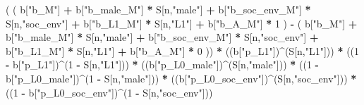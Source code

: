 \documentclass[
]{book}
\newenvironment{Shaded}{\begin{snugshade}}{\end{snugshade}}
\newcommand{\DecValTok}[1]{\textcolor[rgb]{0.00,0.00,0.81}{#1}}
\newcommand{\NormalTok}[1]{#1}
\newcommand{\SpecialCharTok}[1]{\textcolor[rgb]{0.81,0.36,0.00}{\textbf{#1}}}
\newcommand{\StringTok}[1]{\textcolor[rgb]{0.31,0.60,0.02}{#1}}
\begin{document}
\begin{Shaded}
\begin{Highlighting}[]
\NormalTok{      ( ( b[}\StringTok{"b\_M"}\NormalTok{] }\SpecialCharTok{+} 
\NormalTok{            b[}\StringTok{"b\_male\_M"}\NormalTok{] }\SpecialCharTok{*}\NormalTok{ S[n,}\StringTok{"male"}\NormalTok{] }\SpecialCharTok{+} 
\NormalTok{            b[}\StringTok{"b\_soc\_env\_M"}\NormalTok{] }\SpecialCharTok{*}\NormalTok{ S[n,}\StringTok{"soc\_env"}\NormalTok{] }\SpecialCharTok{+} 
\NormalTok{            b[}\StringTok{"b\_L1\_M"}\NormalTok{] }\SpecialCharTok{*}\NormalTok{ S[n,}\StringTok{"L1"}\NormalTok{] }\SpecialCharTok{+}
\NormalTok{            b[}\StringTok{"b\_A\_M"}\NormalTok{] }\SpecialCharTok{*} \DecValTok{1}\NormalTok{ ) }\SpecialCharTok{{-}} 
\NormalTok{          ( b[}\StringTok{"b\_M"}\NormalTok{] }\SpecialCharTok{+} 
\NormalTok{              b[}\StringTok{"b\_male\_M"}\NormalTok{] }\SpecialCharTok{*}\NormalTok{ S[n,}\StringTok{"male"}\NormalTok{] }\SpecialCharTok{+} 
\NormalTok{              b[}\StringTok{"b\_soc\_env\_M"}\NormalTok{] }\SpecialCharTok{*}\NormalTok{ S[n,}\StringTok{"soc\_env"}\NormalTok{] }\SpecialCharTok{+} 
\NormalTok{              b[}\StringTok{"b\_L1\_M"}\NormalTok{] }\SpecialCharTok{*}\NormalTok{ S[n,}\StringTok{"L1"}\NormalTok{] }\SpecialCharTok{+}
\NormalTok{              b[}\StringTok{"b\_A\_M"}\NormalTok{] }\SpecialCharTok{*} \DecValTok{0}\NormalTok{ )) }\SpecialCharTok{*} 
\NormalTok{      ((b[}\StringTok{"p\_L1"}\NormalTok{])}\SpecialCharTok{\^{}}\NormalTok{(S[n,}\StringTok{"L1"}\NormalTok{])) }\SpecialCharTok{*}
\NormalTok{      ((}\DecValTok{1} \SpecialCharTok{{-}}\NormalTok{ b[}\StringTok{"p\_L1"}\NormalTok{])}\SpecialCharTok{\^{}}\NormalTok{(}\DecValTok{1} \SpecialCharTok{{-}}\NormalTok{ S[n,}\StringTok{"L1"}\NormalTok{])) }\SpecialCharTok{*}
\NormalTok{      ((b[}\StringTok{"p\_L0\_male"}\NormalTok{])}\SpecialCharTok{\^{}}\NormalTok{(S[n,}\StringTok{"male"}\NormalTok{])) }\SpecialCharTok{*} 
\NormalTok{      ((}\DecValTok{1} \SpecialCharTok{{-}}\NormalTok{ b[}\StringTok{"p\_L0\_male"}\NormalTok{])}\SpecialCharTok{\^{}}\NormalTok{(}\DecValTok{1} \SpecialCharTok{{-}}\NormalTok{ S[n,}\StringTok{"male"}\NormalTok{])) }\SpecialCharTok{*} 
\NormalTok{      ((b[}\StringTok{"p\_L0\_soc\_env"}\NormalTok{])}\SpecialCharTok{\^{}}\NormalTok{(S[n,}\StringTok{"soc\_env"}\NormalTok{])) }\SpecialCharTok{*}
\NormalTok{      ((}\DecValTok{1} \SpecialCharTok{{-}}\NormalTok{ b[}\StringTok{"p\_L0\_soc\_env"}\NormalTok{])}\SpecialCharTok{\^{}}\NormalTok{(}\DecValTok{1} \SpecialCharTok{{-}}\NormalTok{ S[n,}\StringTok{"soc\_env"}\NormalTok{])) }
    

\end{Highlighting}
\end{Shaded}
\end{document}
